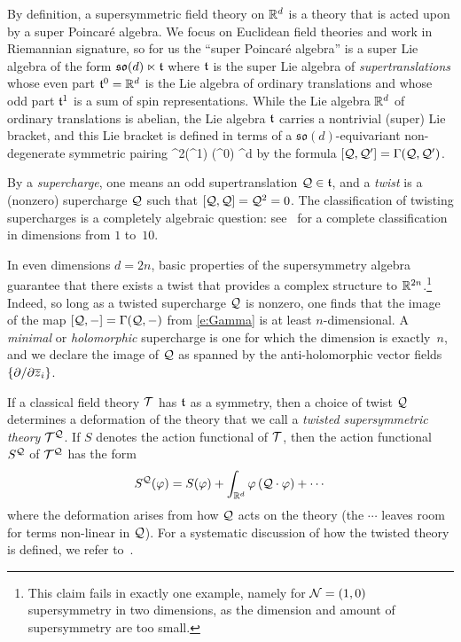 \documentclass[11pt]{amsart}
\def\del{\partial}
\begin{document}
By definition, a supersymmetric field theory on $\mathbb R^d$ is a theory that is acted upon by a super Poincar\'{e} algebra. 
We focus on Euclidean field theories and work in Riemannian signature,
so for us the ``super Poincar\'{e} algebra'' is a super Lie algebra of the form
$\mathfrak{so}(d) \ltimes \mathfrak t$
where $\mathfrak t$ is the super Lie algebra of {\em supertranslations} whose even part $\mathfrak t^0 = \mathbb R^d$ is the Lie algebra of ordinary translations and whose odd part $\mathfrak t^1$ is a sum of spin representations. 
While the Lie algebra $\mathbb R^d$ of ordinary translations is abelian, the Lie algebra $\mathfrak t$ carries a nontrivial (super) Lie bracket,
and this Lie bracket is defined in terms of a $\mathfrak{so}(d)$-equivariant non-degenerate symmetric pairing
\beqn
\label{e:Gamma}
\Gamma {}^2(\ft^{1}) (\ft^0) \cong \RR^d 
\eeqn
by the formula $[\mathcal Q, \mathcal Q'] = \Gamma(\mathcal Q, \mathcal Q')$. 

By a {\em supercharge}, one means an odd supertranslation $\mathcal Q \in \mathfrak t$, and
a {\em twist} is a (nonzero) supercharge $\mathcal Q$ such that $[\mathcal Q,\mathcal Q] = \mathcal Q^2 = 0$. 
The classification of twisting supercharges is a completely algebraic question:
see~\autocite{ESsusy} for a complete classification in dimensions from $1$ to~$10$.

In even dimensions $d = 2n$, basic properties of the supersymmetry algebra guarantee that there exists a twist that provides a complex structure to $\mathbb R^{2n}$.\footnote{This claim fails in exactly one example, namely for $\mathcal N=(1,0)$ supersymmetry in two dimensions, as the dimension and amount of supersymmetry are too small.}
Indeed, so long as a twisted supercharge $\mathcal Q$ is nonzero, 
one finds that the image of the map $[\mathcal Q,-] = \Gamma(\mathcal Q,-)$ from \eqref{e:Gamma} is at least $n$-dimensional.
A {\em minimal} or {\em holomorphic} supercharge is one for which the dimension is exactly~$n$,
and we declare the image of $\mathcal Q$ as spanned by the anti-holomorphic vector fields~$\{\del / \del \zbar_i\}$. 

If a classical field theory $\mathcal T$ has $\mathfrak t$ as a symmetry, 
then a choice of twist $\mathcal Q$ determines a deformation of the theory that we call a {\em twisted supersymmetric theory} $\mathcal T^\mathcal Q$.
If $S$ denotes the action functional of $\mathcal T$, then the action functional $S^\mathcal Q$ of $\mathcal T^\mathcal Q$ has the form
\[
S^\mathcal Q(\varphi) = S(\varphi) + \int_{\mathbb R^d} \varphi  \left(\mathcal Q \cdot \varphi \right) + \cdots 
\]
where the deformation arises from how $\mathcal Q$ acts on the theory 
(the $\cdots$ leaves room for terms non-linear in $\mathcal Q$).
For a systematic discussion of how the twisted theory is defined, 
we refer to~\autocite{CostelloHolomorphic, ESW}. 
\end{document}
